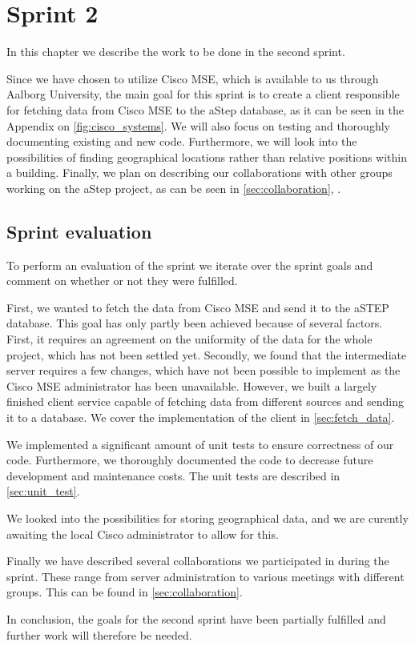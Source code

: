 \chapter{Sprint 2} \label{cha:sprint2}
In this chapter we describe the work to be done in the second sprint. 

Since we have chosen to utilize Cisco MSE, which is available to us through Aalborg University, the main goal for this sprint is to create a client responsible for fetching data from Cisco MSE to the aStep database, as it can be seen in the Appendix on \cref{fig:cisco_systems}. We will also focus on testing and thoroughly documenting existing and new code. Furthermore, we will look into the possibilities of finding geographical locations rather than relative positions within a building. Finally, we plan on describing our collaborations with other groups working on the aStep project, as can be seen in \cref{sec:collaboration}, .






\section{Sprint evaluation}
To perform an evaluation of the sprint we iterate over the sprint goals and comment on whether or not they were fulfilled.

First, we wanted to fetch the data from Cisco MSE and send it to the aSTEP database. This goal has only partly been achieved because of several factors. First, it requires an agreement on the uniformity of the data for the whole project, which has not been settled yet. Secondly, we found that the intermediate server requires a few changes, which have not been possible to implement as the Cisco MSE administrator has been unavailable. However, we built a largely finished client service capable of fetching data from different sources and sending it to a database. We cover the implementation of the client in \cref{sec:fetch_data}.

We implemented a significant amount of unit tests to ensure correctness of our code. Furthermore, we thoroughly documented the code to decrease future development and maintenance costs. The unit tests are described in \cref{sec:unit_test}.

We looked into the possibilities for storing geographical data, and we are curently awaiting the local Cisco administrator to allow for this.

Finally we have described several collaborations we participated in during the sprint. These range from server administration to various meetings with different groups. This can be found in \cref{sec:collaboration}. 

In conclusion, the goals for the second sprint have been partially fulfilled and further work will therefore be needed.
